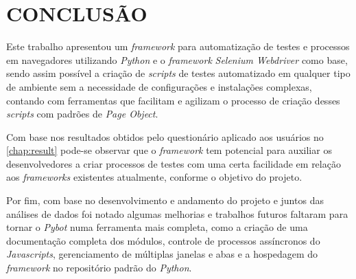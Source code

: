 %
%

\chapter{CONCLUSÃO}\label{chap:conclusao}


    Este trabalho apresentou um \textit{framework} para automatização de testes e processos em navegadores utilizando \textit{Python} e o
    \textit{framework} \textit{Selenium Webdriver} como base, sendo assim possível a criação de \textit{scripts} de testes automatizado em qualquer
    tipo de ambiente sem a necessidade de configurações e instalações complexas, contando com ferramentas que facilitam e agilizam o processo de
    criação desses \textit{scripts} com padrões de \textit{Page Object}.

    Com base nos resultados obtidos pelo questionário aplicado aos usuários no \autoref{chap:result} pode-se observar que o \textit{framework} tem
    potencial para auxiliar os desenvolvedores a criar processos de testes com uma certa facilidade em relação aos \textit{frameworks} existentes
    atualmente, conforme o objetivo do projeto.

    Por fim, com base no desenvolvimento e andamento do projeto e juntos das análises de dados foi notado algumas melhorias e trabalhos futuros faltaram
    para tornar o \textit{Pybot} numa ferramenta mais completa, como a criação de uma documentação completa dos módulos, controle de processos assíncronos
    do \textit{Javascripts}, gerenciamento de múltiplas janelas e abas e a hospedagem do \textit{framework} no repositório padrão do \textit{Python}.
